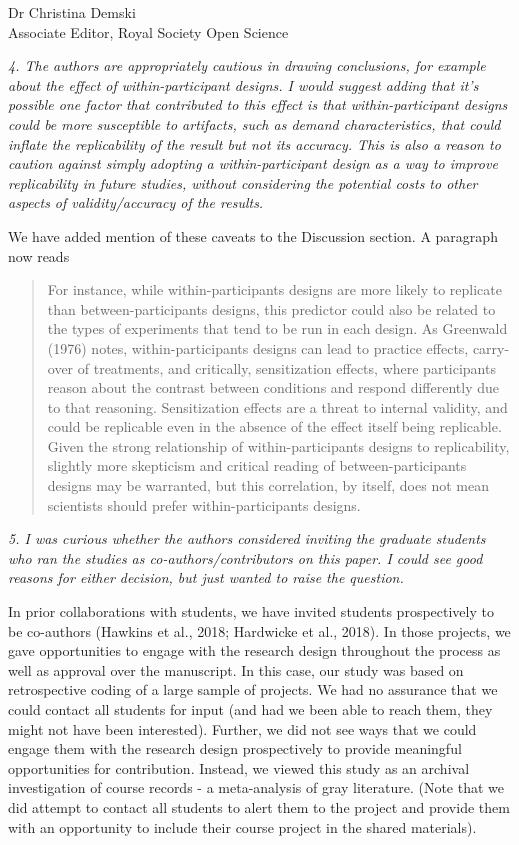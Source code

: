 \documentclass{stanfordletter}
\newcommand{\theysaid}[1]{\begin{leftbar} \noindent 
		\textsl{ #1}\end{leftbar}}
\newcommand{\revised}[1]{\begin{quote}	#1 \end{quote}}
\begin{document}
\begin{letter}{Dr Christina Demski \\ Associate Editor, Royal Society Open Science}
          
          
          
          \theysaid{
          	4. The authors are appropriately cautious in drawing conclusions, for example about the effect of within-participant designs.  I would suggest adding that it's possible one factor that contributed to this effect is that within-participant designs could be more susceptible to artifacts, such as demand characteristics, that could inflate the replicability of the result but not its accuracy.  This is also a reason to caution against simply adopting a within-participant design as a way to improve replicability in future studies, without considering the potential costs to other aspects of validity/accuracy of the results.
          }
          
          We have added mention of these caveats to the Discussion section. A paragraph now reads
          
          \revised{For instance, while within-participants designs are more likely to replicate than between-participants designs, this predictor could also be related to the types of experiments that tend to be run in each design. As Greenwald (1976) notes, within-participants designs can lead to practice effects, carry-over of treatments, and critically, sensitization effects, where participants reason about the contrast between conditions and respond differently due to that reasoning. Sensitization effects are a threat to internal validity, and could be replicable even in the absence of the effect itself being replicable.  Given the strong relationship of within-participants designs to replicability, slightly more skepticism and critical reading of between-participants designs may be warranted, but this correlation, by itself, does not mean scientists should prefer within-participants designs.}
          
          \theysaid{
          	5. I was curious whether the authors considered inviting the graduate students who ran the studies as co-authors/contributors on this paper. I could see good reasons for either decision, but just wanted to raise the question.
          }
          
          In prior collaborations with students, we have invited students prospectively to be co-authors (Hawkins et al., 2018; Hardwicke et al., 2018). In those projects, we gave opportunities to engage with the research design throughout the process as well as approval over the manuscript. In this case, our study was based on retrospective coding of a large sample of projects. We had no assurance that we could contact all students for input (and had we been able to reach them, they might not have been interested). Further, we did not see ways that we could engage them with the research design prospectively to provide meaningful opportunities for contribution. Instead, we viewed this study as an archival investigation of course records - a meta-analysis of gray literature. (Note that we did attempt to contact all students to alert them to the project and provide them with an opportunity to include their course project in the shared materials).
          

\end{letter}
\end{document}
